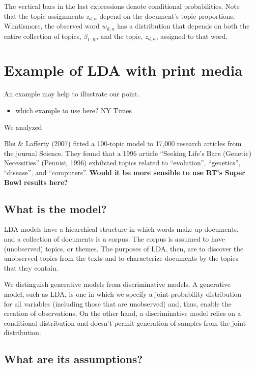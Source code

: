 \documentclass[12pt,]{article}
\providecommand{\tightlist}{%
  \setlength{\itemsep}{0pt}\setlength{\parskip}{0pt}}
\begin{document}
The vertical bars in the last expressions denote conditional
probabilities. Note that the topic assignments \(z_{d,n}\) depend on the
document's topic proportions. Whatismore, the observed word \(w_{d,n}\)
has a distribution that depends on both the entire collection of topics,
\(\beta_{1:K}\), and the topic, \(z_{d,n}\), assigned to that word.

\section{Example of LDA with print
media}\label{example-of-lda-with-print-media}

An example may help to illustrate our point.

\begin{itemize}
\tightlist
\item
  which example to use here? NY Times
\end{itemize}

We analyzed

Blei \& Lafferty (2007) fitted a 100-topic model to 17,000 research
articles from the journal Science. They found that a 1996 article
``Seeking Life's Bare (Genetic) Necessities'' (Pennisi, 1996) exhibited
topics related to ``evolution'', ``genetics'', ``disease'', and
``computers''. \textbf{Would it be more sensible to use RT's Super Bowl
results here?}

\subsection{What is the model?}\label{what-is-the-model}

LDA models have a hiearchical structure in which words make up
documents, and a collection of documents is a corpus. The corpus is
assumed to have (unobserved) topics, or themes. The purposes of LDA,
then, are to discover the unobserved topics from the texts and to
characterize documents by the topics that they contain.

We distinguish generative models from discriminative models. A
generative model, such as LDA, is one in which we specify a joint
probability distribution for all variables (including those that are
unobserved) and, thus, enable the creation of observations. On the other
hand, a discriminative model relies on a conditional distribution and
doesn't permit generation of samples from the joint distribution.

\subsection{What are its assumptions?}\label{what-are-its-assumptions}
\end{document}
